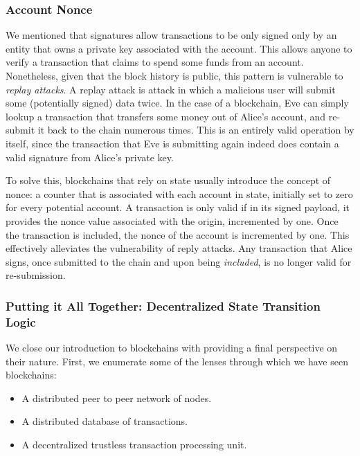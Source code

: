 \subsubsection{Account Nonce} \label{chap_bg:subsec:nonce}

We mentioned that signatures allow transactions to be only signed only by an entity that owns a
private key associated with the account. This allows anyone to verify a transaction that claims to
spend some funds from an account. Nonetheless, given that the block history is public, this pattern
is vulnerable to \textit{replay attacks}. A replay attack is attack in which a malicious user will
submit some (potentially signed) data twice. In the case of a blockchain, Eve can simply lookup a
transaction that transfers some money out of Alice's account, and re-submit it back to the chain
numerous times. This is an entirely valid operation by itself, since the transaction that Eve is
submitting again indeed does contain a valid signature from Alice's private key.

To solve this, blockchains that rely on state usually introduce the concept of nonce: a counter that
is associated with each account in state, initially set to zero for every potential account. A
transaction is only valid if in its signed payload, it provides the nonce value associated with the
origin, incremented by one. Once the transaction is included, the nonce of the account is
incremented by one. This effectively alleviates the vulnerability of reply attacks. Any transaction
that Alice signs, once submitted to the chain and upon being \textit{included}, is no longer valid
for re-submission.


\subsubsection{Putting it All Together: Decentralized State Transition Logic}
\label{chap_bg:subsec:decentralized_state_machine}

We close our introduction to blockchains with providing a final perspective on their nature. First,
we enumerate some of the lenses through which we have seen blockchains:

\begin{itemize}
	\item A distributed peer to peer network of nodes.
	\item A distributed database of transactions.
	\item A decentralized trustless transaction processing unit.
\end{itemize}

